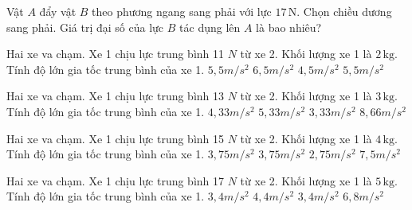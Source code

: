 \begin{bt}
Vật $A$ đẩy vật $B$ theo phương ngang sang phải với lực $17\,\text{N}$. Chọn chiều dương sang phải. Giá trị đại số của lực $B$ tác dụng lên $A$ là bao nhiêu?
\end{bt}

\begin{ex}
Hai xe va chạm. Xe 1 chịu lực trung bình 11 $N$ từ xe 2. Khối lượng xe 1 là $2\,\text{kg}$. Tính độ lớn gia tốc trung bình của xe 1.
\choice
{$5,5 m/s^2$}
{$6,5 m/s^2$}
{$4,5 m/s^2$}
{\True $5,5 m/s^2$}
\end{ex}

\begin{ex}
Hai xe va chạm. Xe 1 chịu lực trung bình 13 $N$ từ xe 2. Khối lượng xe 1 là $3\,\text{kg}$. Tính độ lớn gia tốc trung bình của xe 1.
\choice
{\True $4,33 m/s^2$}
{$5,33 m/s^2$}
{$3,33 m/s^2$}
{$8,66 m/s^2$}
\end{ex}

\begin{ex}
Hai xe va chạm. Xe 1 chịu lực trung bình 15 $N$ từ xe 2. Khối lượng xe 1 là $4\,\text{kg}$. Tính độ lớn gia tốc trung bình của xe 1.
\choice
{$3,75 m/s^2$}
{\True $3,75 m/s^2$}
{$2,75 m/s^2$}
{$7,5 m/s^2$}
\end{ex}

\begin{ex}
Hai xe va chạm. Xe 1 chịu lực trung bình 17 $N$ từ xe 2. Khối lượng xe 1 là $5\,\text{kg}$. Tính độ lớn gia tốc trung bình của xe 1.
\choice
{$3,4 m/s^2$}
{$4,4 m/s^2$}
{\True $3,4 m/s^2$}
{$6,8 m/s^2$}
\end{ex}

